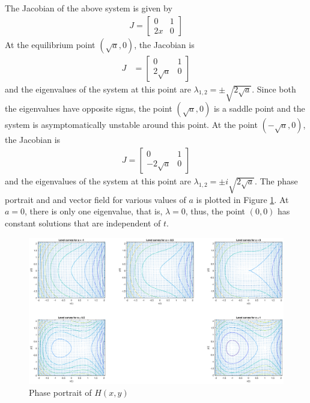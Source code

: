 \documentclass[11pt,1in]{article}
\newenvironment{Example}[2][Example]{\begin{trivlist}
		\item[\hskip \labelsep {\bfseries #1}\hskip \labelsep {\bfseries #2.}]}{\end{trivlist}}
\begin{document}
\begin{Example}{1}
	The Jacobian of the above system is given by 
	\begin{align*}
	J = \begin{bmatrix}
	0 & 1 \\
	2x & 0
	\end{bmatrix}
	\end{align*} 
	At the equilibrium point $(\sqrt{a}, 0)$, the Jacobian is 
	\begin{align*}
	J &= \begin{bmatrix}
	0 & 1 \\
	2\sqrt{a} & 0
	\end{bmatrix}
	\end{align*}
	and the eigenvalues of the system at this point are $\lambda_{1,2} = \pm \sqrt{2 \sqrt{a}}$. Since both the eigenvalues have opposite signs, the point $(\sqrt{a}, 0)$ is a saddle point and the system is asymptomatically unstable around this point. At the point $(-\sqrt{a}, 0)$, the Jacobian is 
	\begin{align*}
	J = \begin{bmatrix}
	0 & 1 \\
	-2\sqrt{a} & 0
	\end{bmatrix}
	\end{align*} 
	and the eigenvalues of the system at this point are $\lambda_{1,2} = \pm i \sqrt{2 \sqrt{a}}$. The phase portrait and and vector field for various values of $a$ is plotted in Figure \ref{fig:hamiltonian}. At $a = 0$, there is only one eigenvalue, that is, $\lambda = 0$, thus, the point $(0,0)$ has constant solutions that are independent of $t$. 
	
\begin{figure}[H]
	\centering
	\includegraphics[trim={2in 0 1.5in 0}, width=\linewidth]{Figures/hamiltonian}
	\caption{Phase portrait of $H(x,y)$}
	\label{fig:hamiltonian}
\end{figure}
\end{Example}
\end{document}
